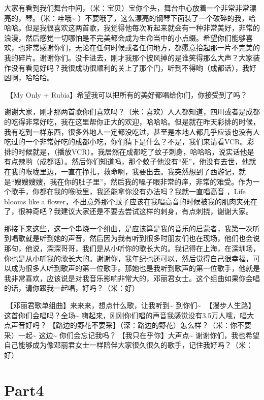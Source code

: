 \documentclass[
]{book}
\begin{document}
大家有看到我们舞台中间，（米：宝贝）宝你个头，舞台中心放着一个非常非常漂亮的，琴。（米：哇哦\textasciitilde{} ）不要哦了，这么漂亮的钢琴下面装了一个破碎的我，哈哈哈。但是我很喜欢这两首歌，我觉得他每次听起来就会有一种非常美好，非常的浪漫，然后感觉一切哪怕是不完美都会成为生命当中的小点缀。希望你们能够喜欢，也非常感谢你们，无论在任何时候或者任何地方，都愿意拾起那一片不完美的我的碎片。谢谢你们。没卡进去，刚才我那个披风掉的是谁笑得那么大声？大家装作没有看见好吗？我很成功很顺利的关上了那个门，听到不得哟（成都话），我好凶啊，哈哈哈。

🎵【My Only + Rubia】希望我可以把所有的美好都唱给你们，你接受到了吗？

谢谢大家，刚才那两首歌你们喜欢吗？（米：喜欢）人人都知道，四川或者是成都的吃得非常好吃，我在这里帮你正大的欢迎，哈哈哈。但是就在昨天彩排的时候，我有吃到一样东西，很多外地人一定都没吃过，甚至是本地人都几乎应该也没有人吃过的一个非常好吃的成都小吃，你们猜下是什么？不是，我们来请看VCR。彩排的时候就是，（播放VCR）。我居然在成都吃了蚊子刺身，哈哈哈，说实话他是有点辣哟（成都话）。然后你们知道吗，那个蚊子他没有``死''，他没有去世，他就在我的喉咙里边，一直在挣扎，救命啊，我要出去。我突然想到了西游记，就是``嫂嫂嫂嫂，我在你的肚子里''，然后我的嗓子眼非常的痒，非常的难受。作为一个歌手，你都在我的喉咙里，我还能拿你没有办法吗？我就一直唱高音 ，Life blooms like a flower，不出意外那个蚊子应该在我唱高音的时候被我的肌肉夹死在了，很神奇吧？我建议大家还是不要去尝试这样的刺身，有点刺挠，谢谢大家。

那接下来这些，这一个串烧一个组曲，是应该算是我的音乐的启蒙者，我第一次听到唱歌就是听到她的声音，然后因为我有听到很多时朋友们也在现场，他们也会说那句，他说，深深哥哥，我们是从小听你的歌长大的。我记得在上海，在深圳场，你也是从小听我的歌长大的。谢谢你，我年纪也还可以，然后觉得自己很幸福，可以成为很多人听到歌声的第一位歌手。那她也是我听到歌声的第一位歌手，他就是我非常喜欢，应该说是对我音乐影响非常大的，邓丽君女士。这个组曲如果你会唱的话，请你跟我一起唱，好吗？（米：好）

🎵【邓丽君歌单组曲】来来来，想点什么歌，让我听到\textasciitilde{} 到你们\textasciitilde{} 🎵【漫步人生路】这首你们会唱吗？全场\textasciitilde{} 嗨起来，刚刚你们唱的声音我感觉没有3.5万人哦，唱大点声音好吗？🎵【路边的野花不要采】（深：路边的野花）怎么样？（米：你不要采）一起\textasciitilde{} 这边\textasciitilde{} 你们会忘记我吗？🎵【我只在乎你】大声点\textasciitilde{} 谢谢你们，我也希望自己能够成为像邓丽君女士一样陪伴大家很久很久的歌手，记住我好吗？（米：好）

\section{Part4}\label{chengdu-20240615-part4}
\end{document}
